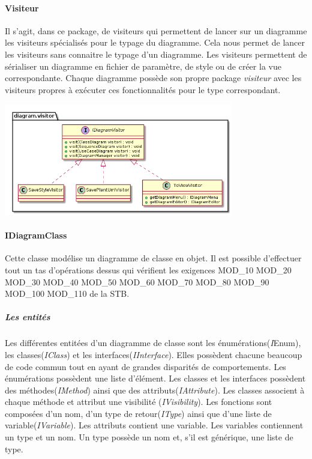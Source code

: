 \documentclass[a4paper,10pt]{article}
\begin{document}
	\paragraph{Visiteur}
	Il s'agit, dans ce package, de visiteurs qui permettent de lancer sur un diagramme les visiteurs spécialisés pour le typage du diagramme. 
	Cela nous permet de lancer les visiteurs sans connaitre le typage d'un diagramme.
	Les visiteurs permettent de sérialiser un diagramme en fichier de paramètre, de style ou de créer la vue correspondante.
	Chaque diagramme possède son propre package \emph{visiteur} avec les visiteurs propres à exécuter ces fonctionnalités pour le type correspondant.
	\begin{center}
	  \includegraphics[width=10cm]{Image/visiteurGlobaux.png}
	\end{center}
	
          \paragraph{IDiagramClass}
	Cette classe modélise un diagramme de classe en objet. Il est possible d'effectuer tout un tas d'opérations dessus qui vérifient les exigences 
	MOD\_10 MOD\_20 MOD\_30 MOD\_40 MOD\_50 MOD\_60 MOD\_70 MOD\_80 MOD\_90 MOD\_100 MOD\_110 de la STB.
	
	\newpage
	\subparagraph{Les entités}
	Les différentes entitées d'un diagramme de classe sont les énumérations(\emph IEnum), les classes(\emph{IClass}) et les interfaces(\emph{IInterface}). 
	Elles possèdent chacune beaucoup de code commun tout en ayant de grandes disparités de comportements.
	Les énumérations possèdent une liste d'élément.
	Les classes et les interfaces possèdent des méthodes(\emph{IMethod}) ainsi que des attributs(\emph{IAttribute}).
	Les classes associent à chaque méthode et attribut une visibilité (\emph{IVisibility}).
	Les fonctions sont composées d'un nom, d'un type de retour(\emph{IType}) ainsi que d'une liste de variable(\emph{IVariable}).
	Les attributs contient une variable.
	Les variables contiennent un type et un nom.
	Un type possède un nom et, s'il est générique, une liste de type.
  
\end{document}
